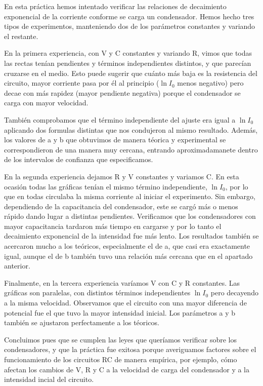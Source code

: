 \documentclass[12pt, a4paper, titlepage]{article}
\begin{document}
  En esta práctica hemos intentado verificar las relaciones de decaimiento exponencial de la corriente conforme se carga un condensador. Hemos hecho tres tipos de experimentos, manteniendo dos de los parámetros constantes y variando el restante.

  En la primera experiencia, con V y C constantes y variando R, vimos que todas las rectas tenían pendientes y términos independientes distintos, y que parecían cruzarse en el medio. Esto puede sugerir que cuánto más baja es la resistencia del circuito, mayor corriente pasa por él al principio ($\ln{I_0}$ menos negativo) pero decae con más rapidez (mayor pendiente negativa) porque el condensador se carga con mayor velocidad.

  También comprobamos que el término independiente del ajuste era igual a $\ln{I_0}$ aplicando dos formulas distintas que nos condujeron al mismo resultado. Además, los valores de a y b que obtuvimos de manera téorica y experimental se correspondieron de una manera muy cercana, entrando aproximadamanete dentro de los intervalos de confianza que especificamos.

  En la segunda experiencia dejamos R y V constantes y variamos C. En esta ocasión todas las gráficas tenían el mismo término independiente, $\ln{I_0}$, por lo que en todas circulaba la misma corriente al iniciar el experimento. Sin embargo, dependiendo de la capacitancia del condensador, este se cargó más o menos rápido dando lugar a distintas pendientes. Verificamos que los condensadores con mayor capacitancia tardaron más tiempo en cargarse y por lo tanto el decaimiento exponencial de la intensidad fue más lento. Los resultados también se acercaron mucho a los teóricos, especialmente el de a, que casi era exactamente igual, aunque el de b también tuvo una relación más cercana que en el apartado anterior.

  Finalmente, en la tercera experiencia varíamos V con C y R constantes. Las gráficas son paralelas, con distintos términos independientes $\ln{I_0}$ pero decayendo a la misma velocidad. Observamos que el circuito con una mayor diferencia de potencial fue el que tuvo la mayor intensidad inicial. Los parámetros a y b también se ajustaron perfectamente a los téoricos.

  Concluimos pues que se cumplen las leyes que queríamos verificar sobre los condensadores, y que la práctica fue exitosa porque averiguamos factores sobre el funcionamiento de los circuitos RC de manera empírica, por ejemplo, cómo afectan los cambios de V, R y C a la velocidad de carga del condensador y a la intensidad incial del circuito.
\end{document}
